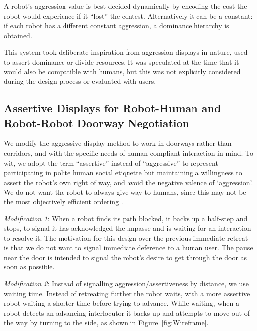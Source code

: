 \documentclass[letterpaper, 10 pt, conference]{ieeeconf}  %
\begin{document}
A robot's aggression value is best decided dynamically by encoding the cost the robot would experience if it ``lost'' the contest. Alternatively it can be a constant: if each robot has a different constant aggression, a dominance hierarchy is obtained.
 
This system took deliberate inspiration from aggression displays in nature, used to assert dominance or divide resources. It was speculated at the time that it would also be compatible with humans, but this was not explicitly considered during the design process or evaluated with users. 


\subsection{Assertive Displays for Robot-Human and Robot-Robot Doorway Negotiation}
We modify the aggressive display method to work in doorways rather than corridors, and with the specific needs of human-compliant interaction in mind. To wit, we adopt the term ``assertive'' instead of ``aggressive'' to  represent participating in polite human social etiquette but maintaining a willingness to assert the robot’s own right of way, and avoid the negative valence of `aggression'. We do not want the robot to always give way to humans, since this may not be the most objectively efficient ordering \cite{zuluaga2005reducing}.


\textit{Modification 1}:  When a robot finds its path blocked, it backs up a half-step and stops, to signal it has acknowledged the impasse and is waiting for an interaction to resolve it. The motivation for this design over the previous immediate retreat is that we do not want to signal immediate deference to a human user. The pause near the door is intended to signal the robot's desire to get through the door as soon as possible.

\textit{Modification 2}: Instead of signalling aggression/assertiveness by distance, we use waiting time. Instead of retreating further the robot waits, with a more assertive robot waiting a shorter time before trying to advance. While waiting, when a robot detects an advancing interlocutor it backs up and attempts to move out of the way by turning to the side, as shown in Figure~\ref{fig:Wireframe}.
\end{document}
